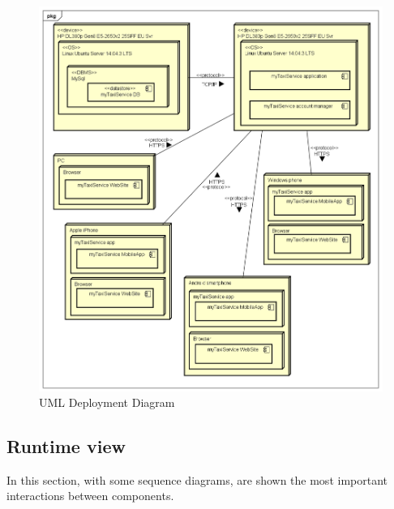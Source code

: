 \documentclass[a4paper]{article}
\begin{document}
\begin{figure}[H]
\includegraphics[width=.9\textwidth]{DeploymentDiagram}
\centering
\caption{UML Deployment Diagram}
\label{fig:deploymentsiagram}
\end{figure}

\subsection{Runtime view}

In this section, with some sequence diagrams, are shown the most important interactions between components.

\newlength{\sequenceWidth}
\setlength{\sequenceWidth}{\textwidth}
\end{document}
